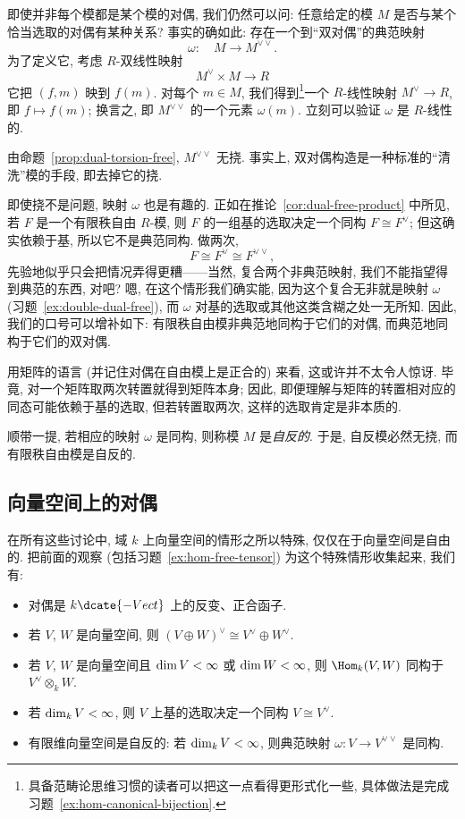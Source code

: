 即使并非每个模都是某个模的对偶, 我们仍然可以问: 任意给定的模 $M$ 是否与某个恰当选取的对偶有某种关系? 事实的确如此: 存在一个到``双对偶''的典范映射
\[
\omega:\quad M\to M^{\vee\vee}.
\]
为了定义它, 考虑 $R$-双线性映射
\[
M^\vee\times M\to R
\]
它把 $(f,m)$ 映到 $f(m)$. 对每个 $m\in M$, 我们得到\footnote{具备范畴论思维习惯的读者可以把这一点看得更形式化一些, 具体做法是完成习题~\ref{ex:hom-canonical-bijection}.}一个 $R$-线性映射 $M^\vee\to R$, 即 $f\mapsto f(m)$; 换言之, 即 $M^{\vee\vee}$ 的一个元素 $\omega(m)$. 立刻可以验证 $\omega$ 是 $R$-线性的.

由命题~\ref{prop:dual-torsion-free}, $M^{\vee\vee}$ 无挠. 事实上, 双对偶构造是一种标准的``清洗''模的手段, 即去掉它的挠.

即使挠不是问题, 映射 $\omega$ 也是有趣的. 正如在推论~\ref{cor:dual-free-product} 中所见, 若 $F$ 是一个有限秩自由 $R$-模, 则 $F$ 的一组基的选取决定一个同构 $F\cong F^\vee$; 但这确实依赖于基, 所以它不是典范同构. 做两次,
\[
F\cong F^\vee\cong F^{\vee\vee},
\]
先验地似乎只会把情况弄得更糟——当然, 复合两个非典范映射, 我们不能指望得到典范的东西, 对吧? 嗯, 在这个情形我们确实能, 因为这个复合无非就是映射 $\omega$ (习题~\ref{ex:double-dual-free}), 而 $\omega$ 对基的选取或其他这类含糊之处一无所知. 因此, 我们的口号可以增补如下: 有限秩自由模非典范地同构于它们的对偶, 而典范地同构于它们的双对偶.

用矩阵的语言 (并记住对偶在自由模上是正合的) 来看, 这或许并不太令人惊讶. 毕竟, 对一个矩阵取两次转置就得到矩阵本身; 因此, 即便理解与矩阵的转置相对应的同态可能依赖于基的选取, 但若转置取两次, 这样的选取肯定是非本质的.

顺带一提, 若相应的映射 $\omega$ 是同构, 则称模 $M$ 是\emph{自反的}. 于是, 自反模必然无挠, 而有限秩自由模是自反的.

\subsection{向量空间上的对偶}\label{subsec:duality-vector-spaces}

在所有这些讨论中, 域 $k$ 上向量空间的情形之所以特殊, 仅仅在于向量空间是自由的. 把前面的观察 (包括习题~\ref{ex:hom-free-tensor}) 为这个特殊情形收集起来, 我们有:

\begin{itemize}
\item 对偶是 $k\dcate{-Vect}$ 上的反变、正合函子.
\item 若 $V$, $W$ 是向量空间, 则 $(V\oplus W)^\vee\cong V^\vee\oplus W^\vee$.
\item 若 $V$, $W$ 是向量空间且 $\operatorname{dim} V<\infty$ 或 $\operatorname{dim} W<\infty$, 则 $\Hom_k(V,W)$ 同构于 $V^\vee\otimes_k W$.
\item 若 $\operatorname{dim}_k V<\infty$, 则 $V$ 上基的选取决定一个同构 $V\cong V^\vee$.
\item 有限维向量空间是自反的: 若 $\operatorname{dim}_k V<\infty$, 则典范映射 $\omega:V\to V^{\vee\vee}$ 是同构.
\end{itemize}

